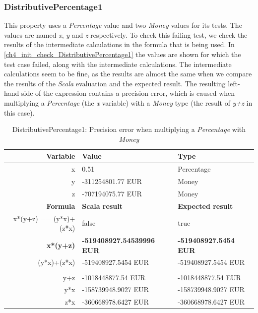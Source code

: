 \subsubsection{DistributivePercentage1}
\label{ssct:ch5_distributivePercentage1}
This property uses a \textit{Percentage} value and two \textit{Money} values
for its tests. The values are named \textit{x}, \textit{y} and \textit{z}
respectively. To check this failing test, we check the results of the
intermediate calculations in the formula that is being used. In
\autoref{ch4_init_check_DistributivePercentage1} the values are shown for which
the test case failed, along with the intermediate calculations. The intermediate
calculations seem to be fine, as the results are almost the same when we compare
the results of the \textit{Scala} evaluation and the expected result. The
resulting left-hand side of the expression contains a precision error, which is
caused when multiplying a \textit{Percentage} (the \textit{x} variable) with a
\textit{Money} type (the result of \textit{y+z} in this case).
\begin{table}[!ht]
\centering
\begin{tabular}{rll}
\hline
\textbf{Variable}      & \textbf{Value}                   & \textbf{Type}                \\ \hline
x                      & 0.51                             & Percentage                   \\
y                      & -311254801.77 EUR                & Money                        \\
z                      & -707194075.77 EUR                & Money                        \\ \hline
\textbf{Formula}       & \textbf{Scala result}            & \textbf{Expected result}     \\ \hline
x*(y+z) == (y*x)+(z*x) & false                            & true                         \\
\textbf{x*(y+z)}       & \textbf{-519408927.54539996 EUR} & \textbf{-519408927.5454 EUR} \\
(y*x)+(z*x)            & -519408927.5454 EUR              & -519408927.5454 EUR          \\
                       &                                  &                              \\
y+z                    & -1018448877.54 EUR               & -1018448877.54 EUR           \\
y*x                    & -158739948.9027 EUR              & -158739948.9027 EUR          \\
z*x                    & -360668978.6427 EUR              & -360668978.6427 EUR          \\ \hline
\end{tabular}
\caption{DistributivePercentage1: Precision error when multiplying a \textit{Percentage} with \textit{Money}}
\label{ch4_init_check_DistributivePercentage1}
\end{table}
\FloatBarrier

